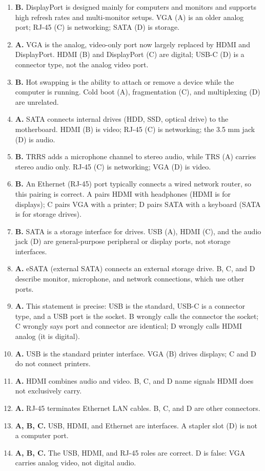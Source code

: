\documentclass[11pt]{article}
\begin{document}
\begin{enumerate}[label=\textbf{Q\arabic*.}, leftmargin=*]
  with pin count; D confuses it with cable speed.
\item \textbf{B.} DisplayPort is designed mainly for computers and monitors
  and supports high refresh rates and multi-monitor setups. VGA (A) is an
  older analog port; RJ-45 (C) is networking; SATA (D) is storage.
\item \textbf{A.} VGA is the analog, video-only port now largely replaced by
  HDMI and DisplayPort. HDMI (B) and DisplayPort (C) are digital; USB-C (D)
  is a connector type, not the analog video port.
\item \textbf{B.} Hot swapping is the ability to attach or remove a device
  while the computer is running. Cold boot (A), fragmentation (C), and
  multiplexing (D) are unrelated.
\item \textbf{A.} SATA connects internal drives (HDD, SSD, optical drive) to
  the motherboard. HDMI (B) is video; RJ-45 (C) is networking; the 3.5 mm jack
  (D) is audio.
\item \textbf{B.} TRRS adds a microphone channel to stereo audio, while TRS
  (A) carries stereo audio only. RJ-45 (C) is networking; VGA (D) is video.
\item \textbf{B.} An Ethernet (RJ-45) port typically connects a wired network
  router, so this pairing is correct. A pairs HDMI with headphones (HDMI is
  for displays); C pairs VGA with a printer; D pairs SATA with a keyboard
  (SATA is for storage drives).
\item \textbf{B.} SATA is a storage interface for drives. USB (A), HDMI (C),
  and the audio jack (D) are general-purpose peripheral or display ports, not
  storage interfaces.
\item \textbf{A.} eSATA (external SATA) connects an external storage drive.
  B, C, and D describe monitor, microphone, and network connections, which use
  other ports.
\item \textbf{A.} This statement is precise: USB is the standard, USB-C is a
  connector type, and a USB port is the socket. B wrongly calls the connector
  the socket; C wrongly says port and connector are identical; D wrongly calls
  HDMI analog (it is digital).

\item \textbf{A.} USB is the standard printer interface. VGA (B) drives displays; C and D do not connect printers.
\item \textbf{A.} HDMI combines audio and video. B, C, and D name signals HDMI does not exclusively carry.
\item \textbf{A.} RJ-45 terminates Ethernet LAN cables. B, C, and D are other connectors.
\item \textbf{A, B, C.} USB, HDMI, and Ethernet are interfaces. A stapler slot (D) is not a computer port.
\item \textbf{A, B, C.} The USB, HDMI, and RJ-45 roles are correct. D is false: VGA carries analog video, not digital audio.
\end{enumerate}
\def\JKSSBLessonID{16}\def\JKSSBAnswers{1}
\end{document}
